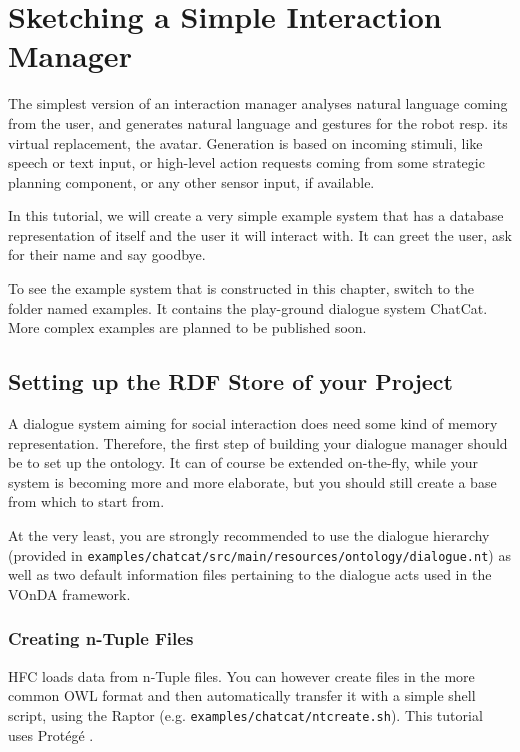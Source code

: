 \documentclass[a4paper]{report}
\newcommand{\vonda}{VOnDA\xspace}
\begin{document}
\chapter{Sketching a Simple Interaction Manager}

The simplest version of an interaction manager analyses natural language
coming from the user, and generates natural language and gestures for the robot
resp. its virtual replacement, the avatar. Generation is based on incoming
stimuli, like speech or text input, or high-level action requests coming from
some strategic planning component, or any other sensor input, if available.

In this tutorial, we will create a very simple example system that has a
database representation of itself and the user it will interact with. It can
greet the user, ask for their name and say goodbye.

To see the example system that is constructed in this chapter, switch to the
folder named examples. It contains the play-ground dialogue system
ChatCat. More complex examples are planned to be published soon.

\section{Setting up the RDF Store of your Project} \label{sec:example-hfc}

A dialogue system aiming for social interaction does need some kind of memory
representation. Therefore, the first step of building your dialogue manager
should be to set up the ontology. It can of course be extended on-the-fly,
while your system is becoming more and more elaborate, but you should still
create a base from which to start from.

At the very least, you are strongly recommended to use the dialogue hierarchy
(provided in \texttt{examples/chatcat/src/main/resources/ontology/dialogue.nt})
as well as two default information files pertaining to the dialogue acts used
in the \vonda framework.

\subsection{Creating n-Tuple Files}

HFC loads data from n-Tuple files. You can however create files in the more
common OWL format and then automatically transfer it with a simple shell
script, using the Raptor \citep{raptor}
(e.g. \texttt{examples/chatcat/ntcreate.sh}). This tutorial uses Protégé
\citep{Protege}.
\end{document}
